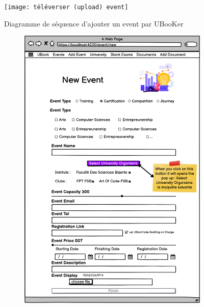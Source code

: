 \documentclass[12pt]{report}
\begin{document}
\begin{figure}[hbtp]
    \centering
    \texttt{[image: téléverser (upload) event]}
    \caption{Diagramme de séquence d'ajouter un event par UBooKer}
    \label{fig:diagramme de séquence d'ajouter un event par ubooker}
\end{figure}
\newpage

\begin{landscape}
\begin{figure}
     \centering
     \begin{subfigure}[b]{0.7\textwidth}
         \centering
         \includegraphics[width=\textwidth]{Add Event}
     \end{subfigure}
     \begin{subfigure}[b]{0.5\textwidth}

\end{subfigure}
\end{figure}
\end{landscape}
\end{document}
